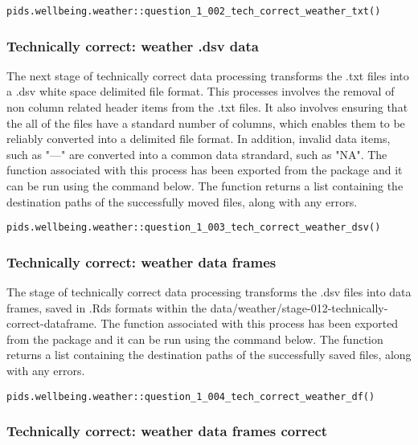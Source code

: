 \documentclass[12pt, oneside, openany]{book}
\begin{document}
\begin{verbatim}
pids.wellbeing.weather::question_1_002_tech_correct_weather_txt()
\end{verbatim}

\subsubsection*{Technically correct: weather .dsv data}

The next stage of technically correct data processing transforms the .txt files into a .dsv white space delimited file format. This processes involves the removal of non column related header items from the .txt files. It also involves ensuring that the all of the files have a standard number of columns, which enables them to be reliably converted into a delimited file format. In addition, invalid data items, such as "---" are converted into a common data strandard, such as "NA". The function associated with this process has been exported from the package and it can be run using the command below. The function returns a list containing the destination paths of the successfully moved files, along with any errors.

\begin{verbatim}
pids.wellbeing.weather::question_1_003_tech_correct_weather_dsv()
\end{verbatim}

\subsubsection*{Technically correct: weather data frames}

The stage of technically correct data processing transforms the .dsv files into data frames, saved in .Rds formats within the data/weather/stage-012-technically-correct-dataframe. The function associated with this process has been exported from the package and it can be run using the command below. The function returns a list containing the destination paths of the successfully saved files, along with any errors.

\begin{verbatim}
pids.wellbeing.weather::question_1_004_tech_correct_weather_df()
\end{verbatim}

\subsubsection*{Technically correct: weather data frames correct}
\end{document}
